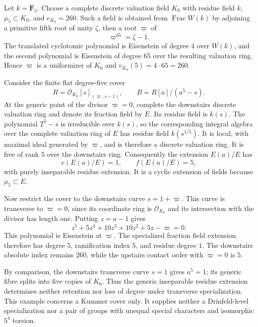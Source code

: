 \begin{example}
\label{ex:fierce-transverse-specialization}
Let $k=\overline{\mathbf F}_5$.  Choose a complete discrete valuation
field $K_0$ with residue field $k$, $\mu _5\subset K_0$, and
$e_{K_0}=260$.  Such a field is obtained from $\operatorname{Frac}W(k)$
by adjoining a primitive fifth root of unity $\zeta$, then a root
$\varpi$ of
\[
  \varpi^{65}=\zeta-1.
\]
The translated cyclotomic polynomial is Eisenstein of degree $4$ over
$W(k)$, and the second polynomial is Eisenstein of degree $65$ over
the resulting valuation ring.  Hence $\varpi$ is a uniformizer of
$K_0$ and $v_{K_0}(5)=4\cdot65=260$.

Consider the finite flat degree-five cover
\[
 R=\mathcal O_{K_0}[s]_{(\varpi,s-1)},
 \qquad B=R[a]/(a^5-s).
\]
At the generic point of the divisor $\varpi=0$, complete the downstairs
discrete valuation ring and denote its fraction field by $E$.
Its residue field is $k(s)$.  The polynomial $T^5-s$ is irreducible
over $k(s)$, so the corresponding integral algebra over the complete
valuation ring of $E$ has residue field $k(s^{1/5})$.  It is local,
with maximal ideal generated by $\varpi$, and is therefore a discrete
valuation ring.  It is free of rank $5$ over the downstairs ring.
Consequently the extension $E(a)/E$ has
\[
  e(E(a)/E)=1,\qquad
  f(E(a)/E)=5,
\]
with purely inseparable residue extension.  It is a cyclic extension
of fields because $\mu _5\subset E$.

Now restrict the cover to the downstairs curve $s=1+\varpi$.
This curve is transverse to $\varpi=0$, since its coordinate ring is
$\mathcal O_{K_0}$ and its intersection with the divisor has length
one.  Putting $z=a-1$ gives
\[
  z^5+5z^4+10z^3+10z^2+5z-\varpi=0.
\]
This polynomial is Eisenstein at $\varpi$.  The specialized fraction
field extension therefore has degree $5$, ramification index $5$,
and residue degree $1$.  The downstairs absolute index remains
$260$, while the upstairs contact order with $\varpi=0$ is $5$.

By comparison, the downstairs transverse curve $s=1$ gives $a^5=1$;
its generic fibre splits into five copies of $K_0$.
Thus the generic inseparable residue extension determines neither
retention nor loss of degree under transverse specialization.
This example concerns a Kummer cover only.  It supplies neither a
Drinfeld-level specialization nor a pair of groups with unequal
special characters and isomorphic $5^4$ torsion.
\end{example}
